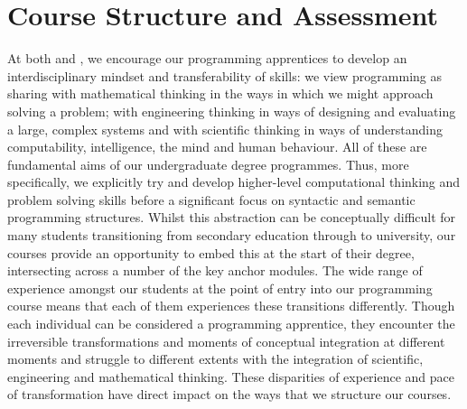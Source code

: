 \documentclass[conference,compsoc]{IEEEtran}
\begin{document}
\section{Course Structure and Assessment}
At both \Bath{} and \Cardiff{}, we encourage our programming
apprentices to develop an interdisciplinary mindset and
transferability of skills: we view programming as sharing with
mathematical thinking in the ways in which we might approach solving a
problem; with engineering thinking in ways of designing and evaluating
a large, complex systems and with scientific thinking in ways of
understanding computability, intelligence, the mind and human
behaviour. All of these are fundamental aims of our undergraduate
degree programmes.  Thus, more specifically, we explicitly try and develop
higher-level computational thinking and problem solving skills before
a significant focus on syntactic and semantic programming
structures. Whilst this abstraction can be conceptually difficult for
many students transitioning from secondary education through to
university, our courses provide an opportunity to embed this at the
start of their degree, intersecting across a number of the key anchor
modules.  The wide range of experience amongst our students at the
point of entry into our programming course means that each of them
experiences these transitions differently. Though each individual can
be considered a programming apprentice, they encounter the
irreversible transformations and moments of conceptual integration at
different moments and struggle to different extents with the
integration of scientific, engineering and mathematical thinking.
These disparities of experience and pace of transformation have direct
impact on the ways that we structure our courses.
\end{document}
